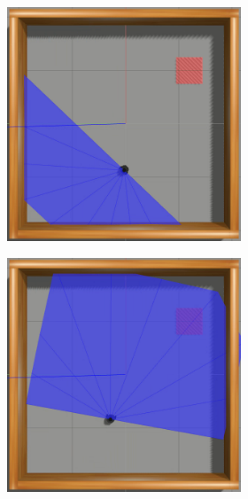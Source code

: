 \vspace{0.25cm}
\begin{figure}[H]
\caption{Imagens sequência no primeiro ambiente simulado do experimento}
    \begin{center}
    \begin{subfigure}[b]{0.60\textwidth}
        \begin{subfigure}[b]{0.24\textwidth}
            \includegraphics[width=\textwidth]{imagens/simulated_envs/sim_env1_ddpg/1.png}
        \end{subfigure}
        \hfill
        \begin{subfigure}[b]{0.24\textwidth}
            \includegraphics[width=\textwidth]{imagens/simulated_envs/sim_env1_ddpg/2.png}

\end{subfigure}
\end{subfigure}
\end{center}
\end{figure}

